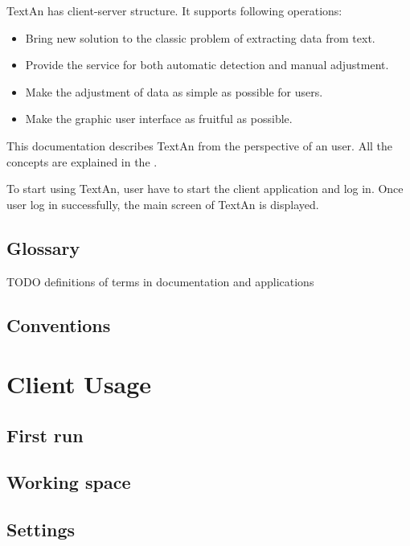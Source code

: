 \documentclass[12pt,a4paper]{report}
\begin{document}
TextAn has client-server structure. It supports following operations:
  
  \begin{itemize}
  \item Bring new solution to the classic problem of extracting data from text.
  \item Provide the service for both automatic detection and manual adjustment.
  \item Make the adjustment of data as simple as possible for users.
  \item Make the graphic user interface as fruitful as possible.
  \end{itemize}

This documentation describes TextAn from the perspective of an user. 
All the concepts are explained in the .

To start using TextAn, user have to start the client application and log in. 
Once user log in successfully, the main screen of TextAn is displayed.


\subsection{Glossary}

TODO definitions of terms in documentation and applications

\subsection{Conventions} %

\section{Client Usage}

\subsection{First run}

\subsection{Working space}

\subsection{Settings}
\label{ssec:Settings}
\end{document}
